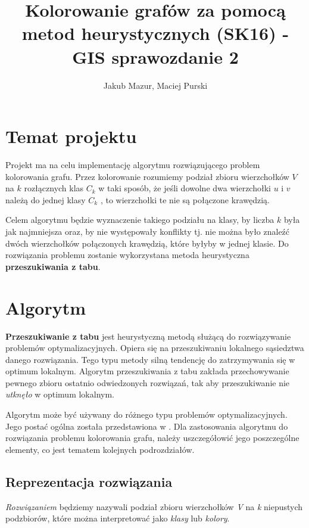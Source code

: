 \documentclass[12pt,a4paper]{article}
\author{Jakub Mazur, Maciej Purski}
\title{Kolorowanie grafów za pomocą metod heurystycznych (SK16) - GIS sprawozdanie 2}
\begin{document}
\maketitle

\section{Temat projektu}

\indent
Projekt ma na celu implementację algorytmu rozwiązującego problem kolorowania grafu.
Przez kolorowanie rozumiemy podział zbioru wierzchołków $V$ na $k$ rozłącznych klas $C_k$ w taki
sposób, że jeśli dowolne dwa wierzchołki $u$ i $v$ należą do jednej klasy $C_k$ , to wierzchołki te nie
są połączone krawędzią.

Celem algorytmu będzie wyznaczenie takiego podziału na klasy, by liczba $k$ była jak
najmniejsza oraz, by nie występowały konflikty tj. nie można było znaleźć dwóch wierzchołków
połączonych krawędzią, które byłyby w jednej klasie.
Do rozwiązania problemu zostanie wykorzystana metoda heurystyczna \textbf{przeszukiwania z tabu}.

\section{Algorytm}

\textbf{Przeszukiwanie z tabu} jest heurystyczną metodą służącą do rozwiązywanie problemów optymalizacyjnych. Opiera się na przeszukiwaniu lokalnego sąsiedztwa danego rozwiązania. Tego typu metody silną tendencję do zatrzymywania się w optimum lokalnym. Algorytm przeszukiwania z tabu zakłada przechowywanie pewnego zbioru ostatnio odwiedzonych rozwiązań, tak aby przeszukiwanie nie \textit{utknęło} w optimum lokalnym.

Algorytm może być używany do różnego typu problemów optymalizacyjnych. Jego postać ogólna została przedstawiona w \cite{alhe-tabu}. Dla zastosowania algorytmu do rozwiązania problemu kolorowania grafu, należy uszczegółowić jego poszczególne elementy, co jest tematem kolejnych podrozdziałów.

\subsection{Reprezentacja rozwiązania}
\textit{Rozwiązaniem} będziemy nazywali podział zbioru wierzchołków \textit{V} na \textit{k} niepustych podzbiorów, które można interpretować jako \textit{klasy} lub \textit{kolory}.
\end{document}
